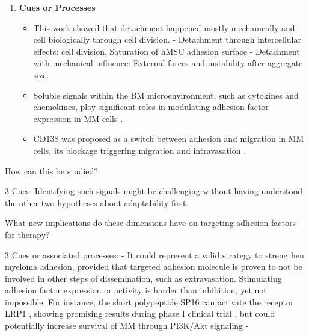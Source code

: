 \begin{enumerate}
      \item \textbf{Cues or Processes}
            \begin{itemize}
                  \item This work showed that detachment happened mostly
                        mechanically and cell biologically through cell
                        division. - Detachment through intercellular effects:
                        cell division, Saturation of hMSC adhesion surface -
                        Detachment with mechanical influence: External forces
                        and instability after aggregate size.
                  \item Soluble signals within the BM microenvironment, such as
                        cytokines and chemokines, play significant roles in modulating
                        adhesion factor expression in MM cells
                        \cite{aggarwalChemokinesMultipleMyeloma2006, alsayedMechanismsRegulationCXCR42007}.
                  \item CD138 was proposed as a switch between adhesion and
                        migration in MM cells, its blockage triggering migration
                        and intravasation
                        \cite{akhmetzyanovaDynamicCD138Surface2020}.
            \end{itemize}
\end{enumerate}



How can this be studied?

3 Cues: Identifying such signals might be challenging without
having understood the other two hypotheses about adaptability first.




What new implications do these dimensions have on targeting adhesion factors for
therapy?

3 Cues or associated processes:
- It could represent a valid strategy to
strengthen myeloma adhesion, provided that targeted adhesion molecule is proven
to not be involved in other steps of dissemination, such as extravasation.
Stimulating adhesion factor expression or activity is harder than inhibition,
yet not impossible. For instance, the short polypeptide SP16 can activate the
receptor LRP1 , showing promising results during phase I
clinical trial \cite{wohlfordPhaseClinicalTrial2021}, but could potentially
increase survival of MM through PI3K/Akt signaling
\cite{potereDevelopingLRP1Agonists2019, heinemannInhibitingPI3KAKT2022} -

